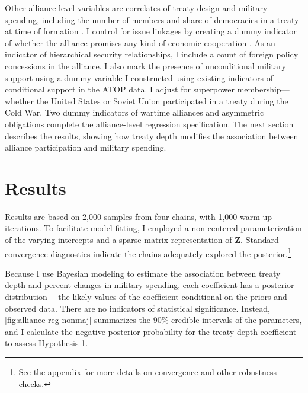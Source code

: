 \documentclass[12pt]{article}
\begin{document}
 
Other alliance level variables are correlates of treaty design and military spending, including the number of members and share of democracies in a treaty at time of formation \citep{Chibaetal2015}. 
I control for issue linkages by creating a dummy indicator of whether the alliance promises any kind of economic cooperation \citep{Poast2013, LongLeeds2006}. 
As an indicator of hierarchical security relationships, I include a count of foreign policy concessions in the alliance. 
I also mark the presence of unconditional military support using a dummy variable I constructed using existing indicators of conditional support in the ATOP data. 
I adjust for superpower membership--- whether the United States or Soviet Union participated in a treaty during the Cold War. 
Two dummy indicators of wartime alliances and asymmetric obligations \citep{Leedsetal2002} complete the alliance-level regression specification. 
The next section describes the results, showing how treaty depth modifies the association between alliance participation and military spending. 

 

\section*{Results}


Results are based on 2,000 samples from four chains, with 1,000 warm-up iterations. 
To facilitate model fitting, I employed a non-centered parameterization of the varying intercepts and a sparse matrix representation of \textbf{Z}. 
Standard convergence diagnostics indicate the chains adequately explored the posterior.\footnote{See the appendix for more details on convergence and other robustness checks.} 


Because I use Bayesian modeling to estimate the association between treaty depth and percent changes in military spending, each coefficient has a posterior distribution--- the likely values of the coefficient conditional on the priors and observed data.
There are no indicators of statistical significance. 
Instead, \autoref{fig:alliance-reg-nonmaj} summarizes the 90\% credible intervals of the parameters, and I calculate the negative posterior probability for the treaty depth coefficient to assess Hypothesis 1.
\end{document}
